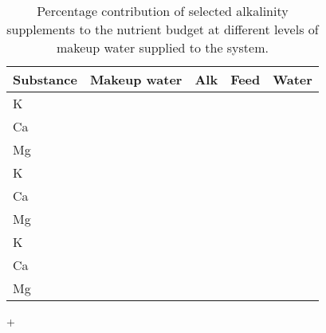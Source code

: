 \begin{table}
\centering
  \begin{threeparttable}
  \caption{Percentage contribution of selected alkalinity supplements to the nutrient budget at different levels of makeup water supplied to the system.}
  \label{tab:alkalinity_cont}
    \begin{tabularx}{\textwidth}{XXccc}

    \toprule

  Substance
  & Makeup water
  & Alk
  & Feed
  & Water
  \\

  \midrule

  K
  &
  &
  &
  &
  \\

  Ca
  &
  &
  &
  &
  \\

  Mg
  &
  &
  &
  &
  \\

    K
  &
  &
  &
  &
  \\

  Ca
  &
  &
  &
  &
  \\

  Mg
  &
  &
  &
  &
  \\

    K
  &
  &
  &
  &
  \\

  Ca
  &
  &
  &
  &
  \\

  Mg
  &
  &
  &
  &
  \\

  \bottomrule
  \end{tabularx}
    \begin{tablenotes}
      \item[+]
    \end{tablenotes}
  \end{threeparttable}
\end{table}
